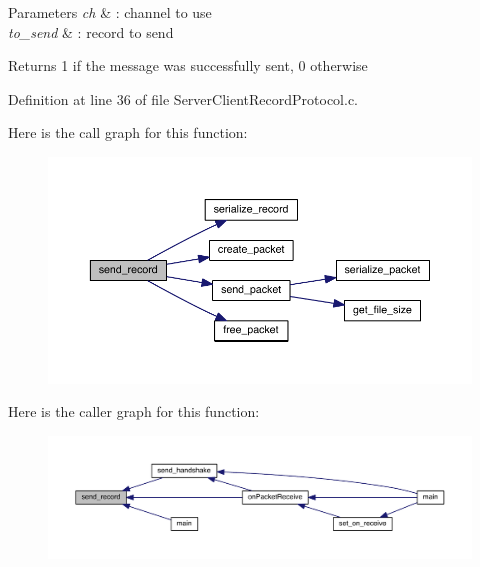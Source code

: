 \begin{DoxyParams}{Parameters}
{\em ch} & \+: channel to use \\
\hline
{\em to\+\_\+send} & \+: record to send \\
\hline
\end{DoxyParams}
\begin{DoxyReturn}{Returns}
1 if the message was successfully sent, 0 otherwise 
\end{DoxyReturn}


Definition at line 36 of file Server\+Client\+Record\+Protocol.\+c.



Here is the call graph for this function\+:\nopagebreak
\begin{figure}[H]
\begin{center}
\leavevmode
\includegraphics[width=350pt]{_server_client_record_protocol_8h_a9c15d75d985c391a872c04a941540f67_cgraph}
\end{center}
\end{figure}




Here is the caller graph for this function\+:\nopagebreak
\begin{figure}[H]
\begin{center}
\leavevmode
\includegraphics[width=350pt]{_server_client_record_protocol_8h_a9c15d75d985c391a872c04a941540f67_icgraph}
\end{center}
\end{figure}


